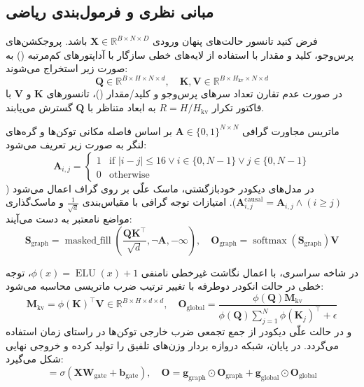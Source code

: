 \subsection{مبانی نظری و فرمول‌بندی ریاضی}
فرض کنید تانسور حالت‌های پنهان ورودی $\mathbf{X} \in \mathbb{R}^{B \times N \times D}$ باشد. پروجکشن‌های پرس‌وجو، کلید و مقدار با استفاده از لایه‌های خطی سازگار با آداپتورهای کم‌مرتبه () به صورت زیر استخراج می‌شوند:
\begin{equation}
\mathbf{Q} \in \mathbb{R}^{B \times H \times N \times d}, \quad \mathbf{K}, \mathbf{V} \in \mathbb{R}^{B \times H_{\text{kv}} \times N \times d}
\end{equation}
در صورت عدم تقارن تعداد سرهای پرس‌وجو و کلید/مقدار ()، تانسورهای $\mathbf{K}$ و $\mathbf{V}$ با فاکتور تکرار $R = H / H_{\text{kv}}$ به ابعاد متناظر با $\mathbf{Q}$ گسترش می‌یابند.

ماتریس مجاورت گرافی $\mathbf{A} \in \{0, 1\}^{N \times N}$ بر اساس فاصله مکانی توکن‌ها و گره‌های لنگر به صورت زیر تعریف می‌شود:
\begin{equation}
\mathbf{A}_{i, j} = \begin{cases} 
1 & \text{if } |i - j| \le 16 \lor i \in \{0, N-1\} \lor j \in \{0, N-1\} \\
0 & \text{otherwise}
\end{cases}
\end{equation}
در مدل‌های دیکودر خودبازگشتی، ماسک علّی بر روی گراف اعمال می‌شود ($\mathbf{A}_{i,j}^{\text{causal}} = \mathbf{A}_{i,j} \land (i \ge j)$). امتیازات توجه گرافی با مقیاس‌بندی $\frac{1}{\sqrt{d}}$ و ماسک‌گذاری مواضع نامعتبر به دست می‌آیند:
\begin{equation}
\mathbf{S}_{\text{graph}} = \operatorname{masked\_fill}\left(\frac{\mathbf{Q} \mathbf{K}^\top}{\sqrt{d}}, \neg \mathbf{A}, -\infty\right), \quad \mathbf{O}_{\text{graph}} = \operatorname{softmax}(\mathbf{S}_{\text{graph}}) \mathbf{V}
\end{equation}

در شاخه سراسری، با اعمال نگاشت غیرخطی نامنفی $\phi(x) = \operatorname{ELU}(x) + 1$، توجه خطی در حالت انکودر دوطرفه با تغییر ترتیب ضرب ماتریسی محاسبه می‌شود:
\begin{equation}
\mathbf{M}_{\text{kv}} = \phi(\mathbf{K})^\top \mathbf{V} \in \mathbb{R}^{B \times H \times d \times d}, \quad \mathbf{O}_{\text{global}} = \frac{\phi(\mathbf{Q}) \mathbf{M}_{\text{kv}}}{\phi(\mathbf{Q}) \sum_{j=1}^N \phi(\mathbf{K}_j)^\top + \epsilon}
\end{equation}
و در حالت علّی ديكودر از جمع تجمعی ضرب خارجی توکن‌ها در راستای زمان استفاده می‌گردد. در پایان، شبکه دروازه بردار وزن‌های تلفیق را تولید کرده و خروجی نهایی شکل می‌گیرد:
\begin{equation}
[\mathbf{g}_{\text{graph}}, \mathbf{g}_{\text{global}}] = \sigma(\mathbf{X} \mathbf{W}_{\text{gate}} + \mathbf{b}_{\text{gate}}), \quad \mathbf{O} = \mathbf{g}_{\text{graph}} \odot \mathbf{O}_{\text{graph}} + \mathbf{g}_{\text{global}} \odot \mathbf{O}_{\text{global}}
\end{equation}

